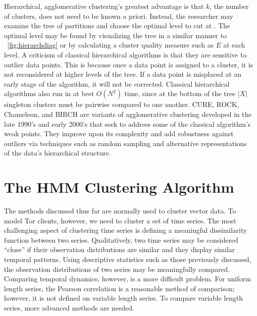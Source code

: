 Hierarchical, agglomerative clustering's greatest advantage is that $k$, the number of clusters, does not need to be known a priori. Instead, the researcher may examine the tree of partitions and choose the optimal level to cut at \citep{xuwunsch}. The optimal level may be found by visualizing the tree in a similar manner to ~\ref{fig:hierarchdiag} or by calculating a cluster quality measure such as $E$ at each level. A criticism of classical hierarchical algorithms is that they are sensitive to outlier data points. This is because once a data point is assigned to a cluster, it is not reconsidered at higher levels of the tree. If a data point is misplaced at an early stage of the algorithm, it will not be corrected. Classical hierarchical algorithms also run in at best $O(N^2)$ time, since at the bottom of the tree $|X|$ singleton clusters must be pairwise compared to one another. CURE, ROCK, Chameleon, and BIRCH are variants of agglomerative clustering developed in the late 1990's and early 2000's that seek to address some of the classical algorithm's weak points\citep{xuwunsch}. They improve upon its complexity and add robustness against outliers via techniques such as random sampling and alternative representations of the data's hierarchical structure.

\section{The HMM Clustering Algorithm}
The methods discussed thus far are normally used to cluster vector data. To model Tor clients, however, we need to cluster a set of time series. The most challenging aspect of clustering time series is defining a meaningful dissimilarity function between two series. Qualitatively, two time series may be considered ``close'' if their observation distributions are similar and they display similar temporal patterns. Using descriptive statistics such as those previously discussed, the observation distributions of two series may be meaningfully compared. Comparing temporal dynamics, however, is a more difficult problem. For uniform length series, the Pearson correlation is a reasonable method of comparison; however, it is not defined on variable length series. To compare variable length series, more advanced methods are needed.

